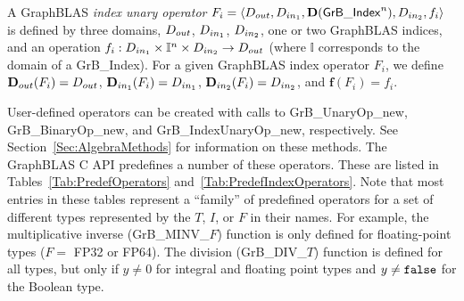 A GraphBLAS \emph{index unary operator} 
$F_i = \langle \mbox{$D_{out}$}, \mbox{$D_{in_{1}}$}, \mathbf{D}({\sf GrB\_Index}^n), \mbox{$D_{in_{2}}$}, f_{i} \rangle$
is defined by three domains, $\mbox{$D_{out}$}$, $\mbox{$D_{in_{1}}$}$, $\mbox{$D_{in_{2}}$}$, one or two GraphBLAS 
indices, and an operation
$f_i: \mbox{$D_{in_{1}}$} \times \mathbb{I}^n \times \mbox{$D_{in_{2}}$} \rightarrow \mbox{$D_{out}$}$ (where $\mathbb{I}$ corresponds to the domain of a {\sf GrB\_Index}).  For a given GraphBLAS 
index operator $F_i$, we define $\mbox{$\mathbf{D}_{out}$}(F_i) = \mbox{$D_{out}$}$, 
$\mbox{$\mathbf{D}_{in_{1}}$}(F_i) = \mbox{$D_{in_{1}}$}$, $\mbox{$\mathbf{D}_{in_{2}}$}(F_i) = \mbox{$D_{in_{2}}$}$, and $\mathbf{f}(F_i) = f_i$.

User-defined operators can be created with calls to {\sf GrB\_UnaryOp\_new}, 
{\sf GrB\_BinaryOp\_new}, and {\sf GrB\_IndexUnaryOp\_new}, respectively.  
See Section~\ref{Sec:AlgebraMethods} for information on these methods.
The GraphBLAS C API predefines a number of these operators.  These are listed 
in Tables~\ref{Tab:PredefOperators} and~\ref{Tab:PredefIndexOperators}.  
Note that most entries in these tables represent a
``family'' of predefined operators for a set of different types represented by
the $T$, $I$, or $F$ in their names.  For example, the multiplicative inverse 
({\sf GrB\_MINV\_$F$}) function is only defined
for floating-point types ($F = $ {\sf FP32} or {\sf FP64}).  The division
({\sf GrB\_DIV\_$T$}) function is defined for all types, but only if $y
\neq 0$ for integral  and floating point types and $y \neq {\tt false}$ for 
the Boolean type.

